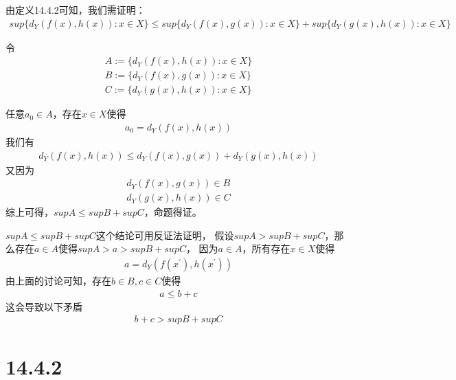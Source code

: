 \documentclass{article}
\begin{document}
\begin{itemize}
        由定义14.4.2可知，我们需证明：
        \begin{align*}
          sup\{d_Y(f(x), h(x)): x \in X\} \leq sup\{d_Y(f(x), g(x)): x \in X\} + sup\{d_Y(g(x), h(x)): x \in X\}
        \end{align*}

        令
        \begin{align*}
          A := \{d_Y(f(x), h(x)): x \in X\} \\
          B := \{d_Y(f(x), g(x)): x \in X\} \\
          C := \{d_Y(g(x), h(x)): x \in X\}
        \end{align*}

        任意$a_0 \in A$，存在$x \in X$使得
        \begin{align*}
          a_0 = d_Y(f(x), h(x))
        \end{align*}
        我们有
        \begin{align*}
          d_Y(f(x), h(x)) \leq d_Y(f(x), g(x)) + d_Y(g(x), h(x))
        \end{align*}
        又因为
        \begin{align*}
          d_Y(f(x), g(x)) \in B \\
          d_Y(g(x), h(x)) \in C
        \end{align*}
        综上可得，$sup A \leq sup B + sup C$，命题得证。

        \begin{zremark}
          $sup A \leq sup B + sup C$这个结论可用反证法证明，
          假设$sup A > sup B + sup C$，那么存在$a \in A$使得$sup A > a > sup B + sup C$，
          因为$a \in A$，所有存在$x \in X$使得
          \begin{align*}
            a = d_Y(f(x^\prime), h(x^\prime))
          \end{align*}
          由上面的讨论可知，存在$b \in B, c \in C$使得
          \begin{align*}
            a \leq b + c
          \end{align*}
          这会导致以下矛盾
          \begin{align*}
            b + c > sup B + sup C
          \end{align*}
        \end{zremark}
\end{itemize}

\section*{14.4.2}
\end{document}
